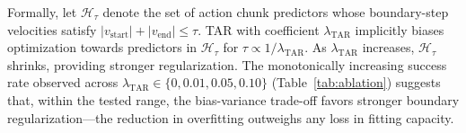 Formally, let $\mathcal{H}_\tau$ denote the set of action chunk predictors whose boundary-step velocities satisfy $|v_{\text{start}}| + |v_{\text{end}}| \leq \tau$. TAR with coefficient $\lambda_{\text{TAR}}$ implicitly biases optimization towards predictors in $\mathcal{H}_\tau$ for $\tau \propto 1/\lambda_{\text{TAR}}$. As $\lambda_{\text{TAR}}$ increases, $\mathcal{H}_\tau$ shrinks, providing stronger regularization. The monotonically increasing success rate observed across $\lambda_{\text{TAR}} \in \{0, 0.01, 0.05, 0.10\}$ (Table~\ref{tab:ablation}) suggests that, within the tested range, the bias-variance trade-off favors stronger boundary regularization---the reduction in overfitting outweighs any loss in fitting capacity.
